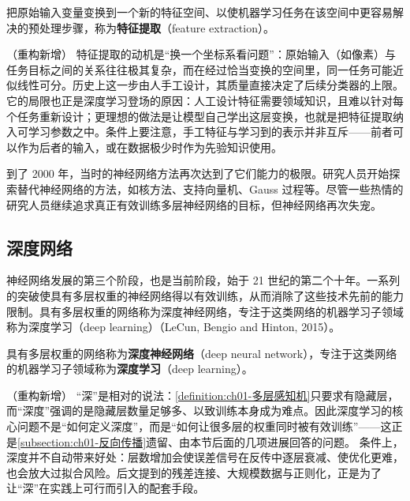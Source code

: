 \documentclass[../../main.tex]{subfiles}
\begin{document}
\begin{definition}[特征提取]\label{definition:ch01-特征提取}
把原始输入变量变换到一个新的特征空间、以使机器学习任务在该空间中更容易解决的预处理步骤，称为\textbf{特征提取}（feature extraction）。
\end{definition}

\begin{remark}（重构新增）
特征提取的动机是“换一个坐标系看问题”：原始输入（如像素）与任务目标之间的关系往往极其复杂，而在经过恰当变换的空间里，同一任务可能近似线性可分。历史上这一步由人手工设计，其质量直接决定了后续分类器的上限。
它的局限也正是深度学习登场的原因：人工设计特征需要领域知识，且难以针对每个任务重新设计；更理想的做法是让模型自己学出这层变换，也就是把特征提取纳入可学习参数之中。条件上要注意，手工特征与学习到的表示并非互斥——前者可以作为后者的输入，或在数据极少时作为先验知识使用。
\end{remark}

到了 2000 年，当时的神经网络方法再次达到了它们能力的极限。研究人员开始探索替代神经网络的方法，如核方法、支持向量机、Gauss 过程等。尽管一些热情的研究人员继续追求真正有效训练多层神经网络的目标，但神经网络再次失宠。

\subsection{深度网络}\label{subsection:ch01-深度网络}

神经网络发展的第三个阶段，也是当前阶段，始于 21 世纪的第二个十年。一系列的突破使具有多层权重的神经网络得以有效训练，从而消除了这些技术先前的能力限制。具有多层权重的网络称为深度神经网络，专注于这类网络的机器学习子领域称为深度学习（deep learning）（LeCun, Bengio and Hinton, 2015）。

\begin{definition}[深度神经网络与深度学习]\label{definition:ch01-深度神经网络与深度学习}
具有多层权重的网络称为\textbf{深度神经网络}（deep neural network），专注于这类网络的机器学习子领域称为\textbf{深度学习}（deep learning）。
\end{definition}

\begin{remark}（重构新增）
“深”是相对的说法：\cref{definition:ch01-多层感知机}只要求有隐藏层，而“深度”强调的是隐藏层数量足够多、以致训练本身成为难点。因此深度学习的核心问题不是“如何定义深度”，而是“如何让很多层的权重同时被有效训练”——这正是\cref{subsection:ch01-反向传播}遗留、由本节后面的几项进展回答的问题。
条件上，深度并不自动带来好处：层数增加会使误差信号在反传中逐层衰减、使优化更难，也会放大过拟合风险。后文提到的残差连接、大规模数据与正则化，正是为了让“深”在实践上可行而引入的配套手段。
\end{remark}
\end{document}
